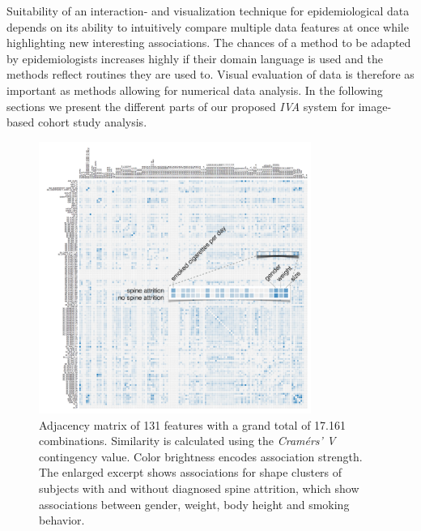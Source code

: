\documentclass[journal]{style/vgtc} 			          %
\begin{document}
%
%
Suitability of an interaction- and visualization technique for epidemiological data depends on its ability to intuitively compare multiple data features at once while highlighting new interesting associations.
%
%
The chances of a method to be adapted by epidemiologists increases highly if their domain language is used and the methods reflect routines they are used to.
%
Visual evaluation of data is therefore as important as methods allowing for numerical data analysis.
%
In the following sections we present the different parts of our proposed \emph{IVA} system for image-based cohort study analysis.


\begin{figure}[htb]
 \centering
 \includegraphics[width=3.5in]{figures/similarity_matrix}
 \caption{Adjacency matrix of 131 features with a grand total of 17.161 combinations. Similarity is calculated using the \emph{Cram\'{e}rs' V} contingency value. Color brightness encodes association strength. The enlarged excerpt shows associations for shape clusters of subjects with and without diagnosed spine attrition, which show associations between gender, weight, body height and smoking behavior.
 }
 \label{fig:similarity}
\end{figure}
\end{document}
